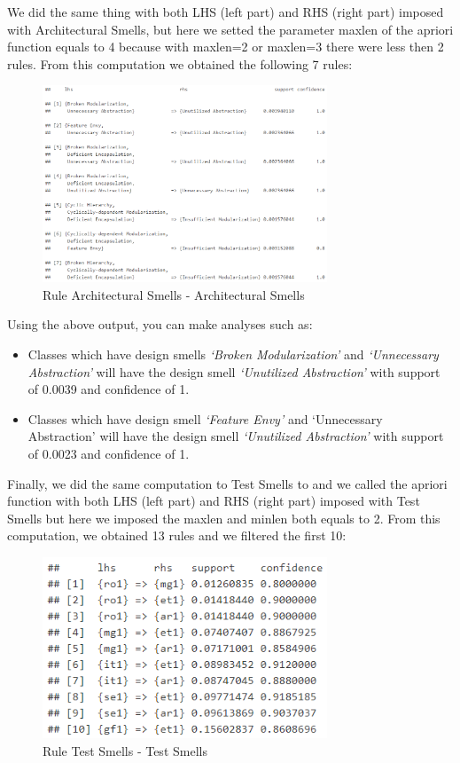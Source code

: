 We did the same thing with both LHS (left part) and RHS (right part) imposed with Architectural Smells, but here we setted the parameter maxlen of the apriori function equals to 4 because with maxlen=2 or maxlen=3 there were less then 2 rules. From this computation we obtained the following 7 rules: \par
\begin{figure}[htp]
    \centering
    \includegraphics[width=8.5cm]{img/ruleArch.PNG}
    \caption{Rule Architectural Smells - Architectural Smells}
    \label{fig:ruleArch}
\end{figure}
Using the above output, you can make analyses such as:
\begin{itemize}
  \item Classes which have design smells \textit{‘Broken Modularization’} and \textit{‘Unnecessary Abstraction’} will have the design smell \textit{‘Unutilized Abstraction’} with support of 0.0039 and confidence of 1.
  \item Classes which have design smell \textit{‘Feature Envy’} and ‘Unnecessary Abstraction’ will have the design smell \textit{‘Unutilized Abstraction’} with support of 0.0023 and confidence of 1.
\end{itemize}

Finally, we did the same computation to Test Smells to and we called the apriori function with both LHS (left part) and RHS (right part) imposed with Test Smells but here we imposed the maxlen and minlen both equals to 2. From this computation, we obtained 13 rules and we filtered the first 10:
\begin{figure}[htp]
    \centering
    \includegraphics[width=8.5cm]{img/ruleTest.PNG}
    \caption{Rule Test Smells - Test Smells}
    \label{fig:ruleTest}
\end{figure}


